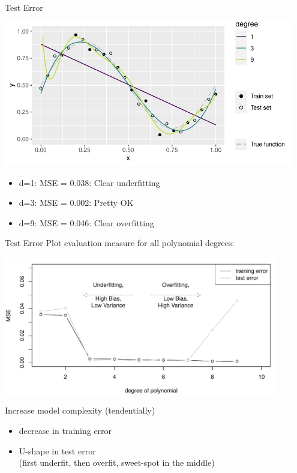 \documentclass[11pt,compress,t,notes=noshow, xcolor=table]{beamer}
\newenvironment{knitrout}{}{} %
\begin{document}
\begin{vbframe}{Test Error}
\begin{knitrout}\scriptsize
{}\color{fgcolor}

{\centering \includegraphics[width=0.95\textwidth]{figure/eval_test_2} 

}



\end{knitrout}

\begin{itemize}
\item d=1: MSE = 0.038: Clear underfitting
\item d=3: MSE = 0.002: Pretty OK
\item d=9: MSE = 0.046: Clear overfitting
\end{itemize}

\end{vbframe}


\begin{vbframe}{Test Error}
Plot evaluation measure for all polynomial degrees:
\begin{knitrout}\scriptsize
{}\color{fgcolor}

{\centering \includegraphics[width=0.9\textwidth]{figure/eval_test_3} 

}



\end{knitrout}

Increase model complexity (tendentially)
\begin{itemize}
\item decrease in training error\\
\item U-shape in test error\\ 
(first underfit, then overfit, sweet-spot in the middle)
\end{itemize}
\end{vbframe}
\end{document}
